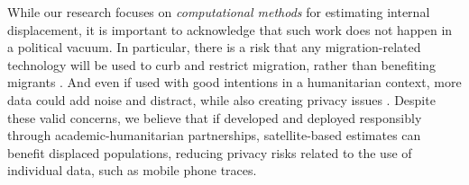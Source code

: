 \documentclass[sn-basic]{sn-jnl}%
\begin{document}
While our research focuses on \emph{computational methods} for estimating internal displacement, it is important to acknowledge that such work does not happen in a political vacuum. In particular, there is a risk that any migration-related technology will be used to curb and restrict migration, rather than benefiting migrants \citep{Bircan_and_Korkmax_2021}. And even if used with good intentions in a humanitarian context, more data could add noise and distract, while also creating privacy issues \citep{Dijstelbloem_2017}.
Despite these valid concerns, we believe that if developed and deployed responsibly through academic-humanitarian partnerships, satellite-based estimates can benefit displaced populations, reducing privacy risks related to the use of individual data, such as mobile phone traces.




\end{document}
